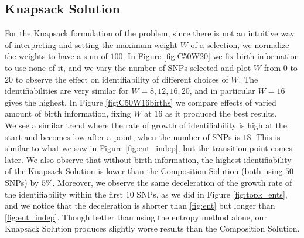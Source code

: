 \documentclass[14pt, oneside]{article}   	%
\begin{document}
\subsection{Knapsack Solution}
For the Knapsack formulation of the problem, since there is not an intuitive way of interpreting and setting the maximum weight $W$ of a selection,
we normalize the weights to have a sum of $100$.
In Figure \ref{fig:C50W20} we fix birth information to use none of it, and we vary the number of SNPs selected
and plot $W$ from $0$ to $20$ to observe the effect on identifiability of different choices of $W$.
The identifiabilities are very similar for $W=8, 12, 16, 20$, and in particular $W=16$ gives the highest.
In Figure \ref{fig:C50W16births} we compare effects of varied amount of birth information, fixing $W$ at $16$ as it produced the best results.
\\
We see a similar trend where the rate of growth of identifiability is high at the start and becomes low after a point, when the number of SNPs is $18$.
This is similar to what we saw in Figure \ref{fig:ent_indep}, but the transition point comes later.
We also observe that without birth information,
the highest identifiability of the Knapsack Solution is lower than the Composition Solution (both using $50$ SNPs) by $5\%$.
Moreover, we observe the same deceleration of the growth rate of the identifiability within the first $10$ SNPs, as we did in Figure \ref{fig:topk_ents},
and we notice that the deceleration is shorter than \ref{fig:ent} but longer than \ref{fig:ent_indep}.
Though better than using the entropy method alone, our Knapsack Solution produces slightly worse results than the Composition Solution.
%
%
%
%
%
\end{document}
